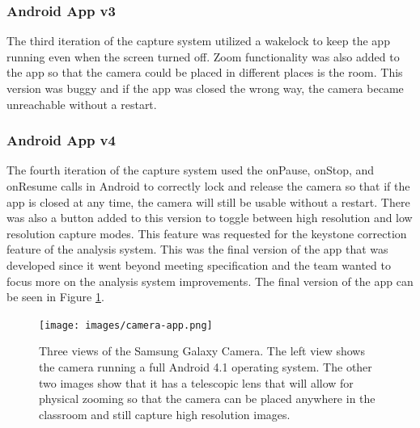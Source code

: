\documentclass[]{article}
\begin{document}
			\subsubsection{Android App v3}
				The third iteration of the capture system utilized a wakelock to keep the app running even when the screen turned off. Zoom functionality was also added to the app so that the camera could be placed in different places is the room. This version was buggy and if the app was closed the wrong way, the camera became unreachable without a restart. 
				
			\subsubsection{Android App v4}
				The fourth iteration of the capture system used the onPause, onStop, and onResume calls in Android to correctly lock and release the camera so that if the app is closed at any time, the camera will still be usable without a restart. There was also a button added to this version to toggle between high resolution and low resolution capture modes. This feature was requested for the keystone correction feature of the analysis system. This was the final version of the app that was developed since it went beyond meeting specification and the team wanted to focus more on the analysis system improvements. The final version of the app can be seen in Figure \ref{img:camera-app}.
				
				\begin{figure}[h]
					\centering
					\texttt{[image: images/camera-app.png]}
					\caption{Three views of the Samsung Galaxy Camera. The left view shows the camera running a full Android 4.1 operating system. The other two images show that it has a telescopic lens that will allow for physical zooming so that the camera can be placed anywhere in the classroom and still capture high resolution images.}		
					\label{img:camera-app}
				\end{figure}
				
		
\end{document}
